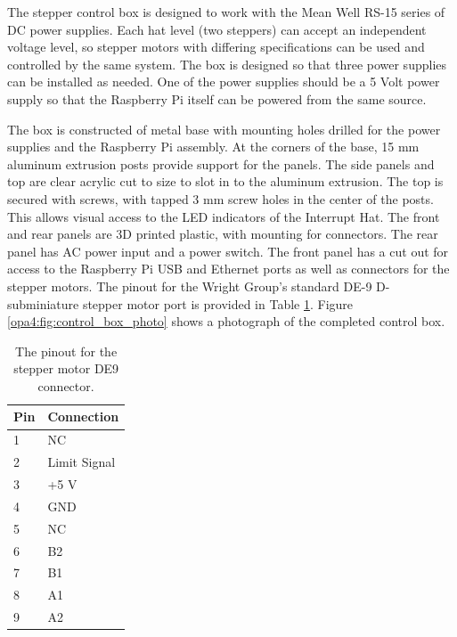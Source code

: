 The stepper control box is designed to work with the Mean Well RS-15 series of DC power supplies\cite{}.
Each hat level (two steppers) can accept an independent voltage level, so stepper motors with differing specifications can be used and controlled by the same system.
The box is designed so that three power supplies can be installed as needed.
One of the power supplies should be a 5 Volt power supply so that the Raspberry Pi itself can be powered from the same source.

The box is constructed of metal base with mounting holes drilled for the power supplies and the Raspberry Pi assembly.
At the corners of the base, 15 mm aluminum extrusion posts provide support for the panels.
The side panels and top are clear acrylic cut to size to slot in to the aluminum extrusion.
The top is secured with screws, with tapped 3 mm screw holes in the center of the posts.
This allows visual access to the LED indicators of the Interrupt Hat.
The front and rear panels are 3D printed plastic, with mounting for connectors.
The rear panel has AC power input and a power switch.
The front panel has a cut out for access to the Raspberry Pi USB and Ethernet ports as well as connectors for the stepper motors.
The pinout for the Wright Group's standard DE-9 D-subminiature stepper motor port is provided in Table \ref{opa4:tab:de9}.
Figure \ref{opa4:fig:control_box_photo} shows a photograph of the completed control box.

\begin{table}[]
\begin{tabular}{ll}
\hline
Pin & Connection   \\ \hline
1   & NC           \\
2   & Limit Signal \\
3   & +5 V         \\
4   & GND          \\
5   & NC           \\
6   & B2           \\
7   & B1           \\
8   & A1           \\
9   & A2           \\ \hline
\end{tabular}
	\caption[Stepper Motor DE9 Pinout]{The pinout for the stepper motor DE9 connector.}
	\label{opa4:tab:de9}
\end{table}

